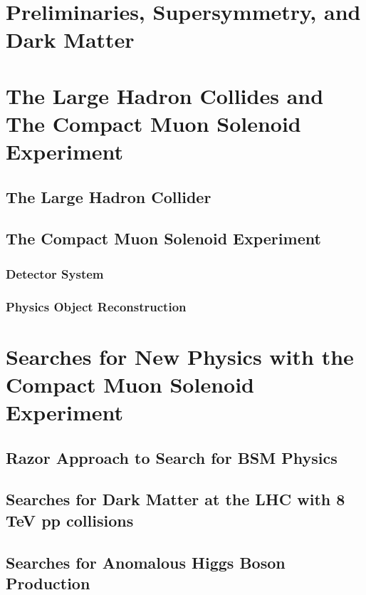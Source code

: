 \documentclass[14pt]{caltech_thesis}
\begin{document}
\tableofcontents
\listoffigures
\listoftables
\printnomenclature

\mainmatter
\part{Preliminaries, Supersymmetry, and Dark Matter}

\part{The Large Hadron Collides and The Compact Muon Solenoid Experiment}
\chapter{The Large Hadron Collider}

\chapter{The Compact Muon Solenoid Experiment}
\section{Detector System}

\section{Physics Object Reconstruction}

\part{ Searches for New Physics with the Compact Muon Solenoid
  Experiment}

\chapter{Razor Approach to Search for BSM Physics}

\chapter{Searches for Dark Matter at the LHC with 8 TeV pp collisions}

\chapter{Searches for Anomalous Higgs Boson Production}

\end{document}
